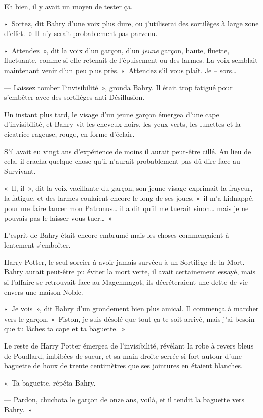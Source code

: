Eh bien, il y avait un moyen de tester ça.

«~Sortez, dit Bahry d'une voix plus dure, ou j'utiliserai des sortilèges à large zone d'effet.~»
Il n'y serait probablement pas parvenu.

«~Attendez~», dit la voix d'un garçon, d'un \emph{jeune} garçon, haute, fluette, fluctuante, comme si elle retenait de l'épuisement ou des larmes.
La voix semblait maintenant venir d'un peu plus près.
«~Attendez s'il vous plaît.
Je -- sors…

--- Laissez tomber l'invisibilité~», gronda Bahry.
Il était trop fatigué pour s'embêter avec des sortilèges anti-Désillusion.

Un instant plus tard, le visage d'un jeune garçon émergea d'une cape d'invisibilité, et Bahry vit les cheveux noirs, les yeux verts, les lunettes et la cicatrice rageuse, rouge, en forme d'éclair.

S'il avait eu vingt ans d'expérience de moins il aurait peut-être cillé.
Au lieu de cela, il cracha quelque chose qu'il n'aurait probablement pas dû dire face au Survivant.

«~Il, il~», dit la voix vacillante du garçon, son jeune visage exprimait la frayeur, la fatigue, et des larmes coulaient encore le long de ses joues, «~il m'a kidnappé, pour me faire lancer mon Patronus… il a dit qu'il me tuerait sinon… mais je ne pouvais pas le laisser vous tuer…~»

L'esprit de Bahry était encore embrumé mais les choses commençaient à lentement s'emboîter.

Harry Potter, le seul sorcier à avoir jamais survécu à un Sortilège de la Mort.
Bahry aurait peut-être pu éviter la mort verte, il avait certainement essayé, mais si l'affaire se retrouvait face au Magenmagot, ils décréteraient une dette de vie envers une maison Noble.

«~Je vois~», dit Bahry d'un grondement bien plus amical.
Il commença à marcher vers le garçon.
«~Fiston, je suis désolé que tout ça te soit arrivé, mais j'ai besoin que tu lâches ta cape et ta baguette.~»

Le reste de Harry Potter émergea de l'invisibilité, révélant la robe à revers bleus de Poudlard, imbibées de sueur, et sa main droite serrée si fort autour d'une baguette de houx de trente centimètres que ses jointures en étaient blanches.

«~Ta baguette, répéta Bahry.

--- Pardon, chuchota le garçon de onze ans, voilà, et il tendit la baguette vers Bahry.~»

